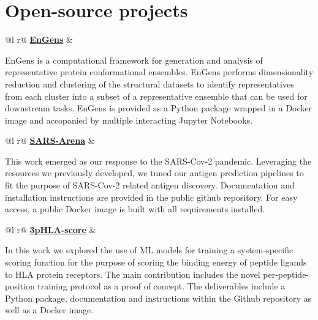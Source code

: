 \documentclass[a4paper,12pt]{article}
\begin{document}

\section{Open-source projects}

\begin{tabularx}{\linewidth}{ @{}l r@{} }
 \href{https://github.com/anon528/supreme-couscous}{\faGithub \textbf{EnGens}} &\\[3.75pt]
\begin{minipage}[t]{\linewidth}
EnGens is a computational framework for generation and analysis of representative protein conformational ensembles. EnGens performs dimensionality reduction and clustering of the structural datasets to identify representatives from each cluster into a subset of a representative ensemble that can be used for downstream tasks. EnGens is provided as a Python package wrapped in a Docker image and accopanied by multiple interacting Jupyter Notebooks.    
\end{minipage}
\end{tabularx}

\begin{tabularx}{\linewidth}{ @{}l r@{} }
 \href{https://github.com/KavrakiLab/SARS-Arena}{\faGithub \textbf{SARS-Arena}} &\\[3.75pt]
\begin{minipage}[t]{\linewidth}
This work emerged as our response to the SARS-Cov-2 pandemic. Leveraging the resources we previously developed, we tuned our antigen prediction pipelines to fit the purpose of SARS-Cov-2 related antigen discovery. Documentation and installation instructions are provided in the public github repository. For easy access, a public Docker image is built with all requirements installed.      
\end{minipage}
\end{tabularx}

\begin{tabularx}{\linewidth}{ @{}l r@{} }
 \href{https://github.com/KavrakiLab/3pHLA-score}{\faGithub \textbf{3pHLA-score}} &\\[3.75pt]
\begin{minipage}[t]{\linewidth}
In this work we explored the use of ML models for training a system-specific scoring function for the purpose of scoring the binding energy of peptide ligands to HLA protein receptors. The main contribution includes the novel per-peptide-position training protocol as a proof of concept. The deliverables include a Python package, documentation and instructions within the Github repository as well as a Docker image.
\end{minipage}
\end{tabularx}
\end{document}
